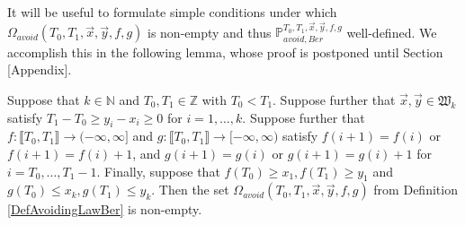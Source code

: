 It will be useful to formulate simple conditions under which $\Omega_{avoid}(T_0, T_1, \vec{x}, \vec{y}, f,g)$ is non-empty and thus $\mathbb{P}_{avoid, Ber}^{T_0,T_1, \vec{x}, \vec{y}, f, g}$ well-defined. We accomplish this in the following lemma, whose proof is postponed until Section [Appendix].
\begin{lemma}\label{LemmaWD} Suppose that $k \in \mathbb{N}$ and $T_0, T_1 \in \mathbb{Z}$ with $T_0 < T_1$. Suppose further that $\vec{x}, \vec{y} \in \mathfrak{W}_k$ satisfy $T_1 - T_0 \geq y_i - x_i \geq 0$ for $i = 1, \dots, k$. Suppose further that $f : \llbracket T_0, T_1 \rrbracket \rightarrow (-\infty, \infty]$ and $g : \llbracket T_0, T_1 \rrbracket \rightarrow [-\infty, \infty)$ satisfy $f (i+1) = f(i)$ or $f(i+1) = f(i) + 1$, and $g(i+1) = g(i)$ or $g(i+1) = g(i) +1$ for $i = T_0, \dots, T_1 -1$. Finally, suppose that $f(T_0) \geq x_1, f(T_1) \geq y_1$ and $g(T_0) \leq x_k, g(T_1) \leq y_k$. Then the set $\Omega_{avoid}(T_0, T_1, \vec{x}, \vec{y}, f,g)$ from Definition \ref{DefAvoidingLawBer} is non-empty.
\end{lemma}

